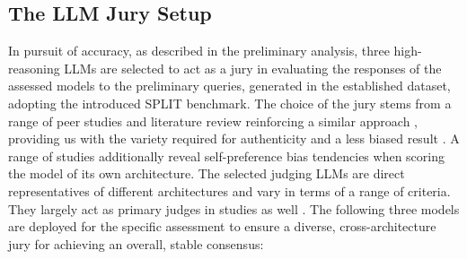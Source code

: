 \documentclass[10pt, twocolumn]{article}
\begin{document}
\subsection{The LLM Jury Setup}
In pursuit of accuracy, as described in the preliminary analysis, three high-reasoning LLMs are selected to act as a jury \cite{zheng2023judgingllmasajudgemtbenchchatbot, fu2025reliablemultilingualllmasajudge, bavaresco2025llmsinsteadhumanjudges} in evaluating the responses of the assessed models to the preliminary queries, generated in the established dataset, adopting the introduced SPLIT benchmark. The choice of the jury stems from a range of peer studies and literature review reinforcing a similar approach \cite{zheng2023judgingllmasajudgemtbenchchatbot, han2025judgesverdictcomprehensiveanalysis, li2025generationjudgmentopportunitieschallenges, chen2026benchmarkingllmasajudgelongformoutput}, providing us with the variety required for authenticity and a less biased result \cite{soumik2026judgingjudgessystematicevaluation, zheng2023judgingllmasajudgemtbenchchatbot}. 
A range of studies additionally reveal self-preference bias tendencies \cite{pombal2026selfpreference, li2026preferenceleakagecontaminationproblem, li2026evaluating} when scoring the model of its own architecture. 
The selected judging LLMs are direct representatives of different architectures and vary in terms of a range of criteria. They largely act as primary judges in studies as well \cite{bellibatlu2026judgesensebenchmarkpromptsensitivity}. The following three models are deployed for the specific assessment to ensure a diverse, cross-architecture jury for achieving an overall, stable consensus: 
\end{document}
